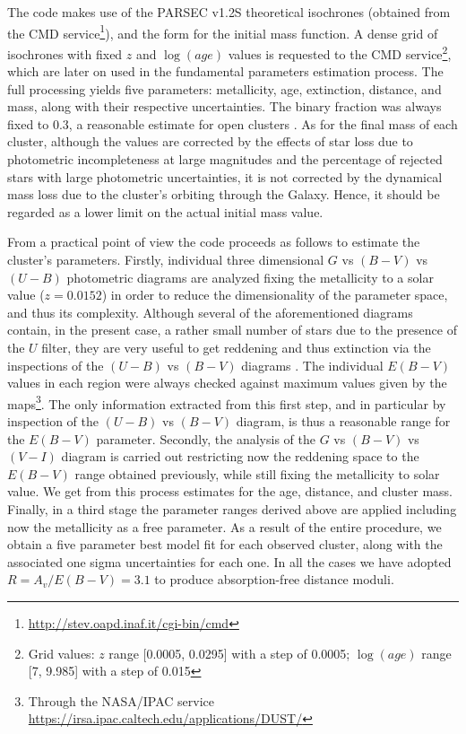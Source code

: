 \documentclass[draft]{aa}
\begin{document}
The code makes use of the PARSEC v1.2S \citep{Bressan_2012} theoretical
isochrones (obtained from the CMD
service\footnote{\url{http://stev.oapd.inaf.it/cgi-bin/cmd}}), and the
\cite{Kroupa_2002} form for the initial mass function. A dense grid of
isochrones with fixed $z$ and $\log(age)$ values is requested to the CMD
service\footnote{Grid values: $z$ range [0.0005, 0.0295] with a step of
0.0005; $\log(age)$ range [7, 9.985] with a step of 0.015}, which are later on
used in the fundamental parameters estimation
process. The full processing yields five parameters: metallicity, age,
extinction, distance, and mass, along with their respective uncertainties. The
binary fraction was always fixed to 0.3, a reasonable
estimate for open clusters \citep{Sollima_2010}. As for the final mass of each
cluster, although the values are corrected by the effects of star loss
due to photometric incompleteness at large magnitudes and the
percentage of rejected stars with large photometric uncertainties, it is not
corrected by the dynamical mass loss due to the cluster's orbiting through the
Galaxy. Hence, it should be regarded as a lower limit on the actual initial
mass value.

From a practical point of view the code proceeds as follows to estimate the
cluster's parameters. Firstly, individual three dimensional $G$ vs $(B-V)$ vs $
(U-B)$ photometric diagrams are analyzed fixing the metallicity to a solar
value ($z = 0.0152$) in order to reduce the dimensionality of the parameter
space, and thus its complexity. Although several of the aforementioned diagrams
contain, in the present case, a rather small number of stars due to the
presence of the $U$ filter, they are very useful to get reddening and thus
extinction via the inspections of the $(U-B)$ vs $(B-V)$ diagrams
\citep[e.g.,][]{Vazquez2008} .
%
The individual $E(B-V)$ values in each region were always checked against
maximum values given by the \cite{Schlafly_2011} maps\footnote{Through the
NASA/IPAC service \url{https://irsa.ipac.caltech.edu/applications/DUST/}}.
The only information extracted from this first step, and in particular
by inspection of the $(U-B)$ vs $(B-V)$ diagram, is thus a reasonable range for
the $E(B-V)$ parameter.
%
Secondly, the analysis of the $G$ vs $(B-V)$ vs $(V-I)$ diagram is carried out
restricting now the reddening space to the $E(B-V)$ range obtained previously,
while still fixing the metallicity to solar value. We get from this process
estimates for the age, distance, and cluster mass.
%
Finally, in a third stage the parameter ranges derived above are applied
including now the metallicity as a free parameter.
As a result of the entire procedure, we obtain a five parameter best model fit
for each observed cluster, along with the associated one sigma uncertainties
for each one. In all the cases we have adopted $R=A_v/E(B-V) = 3.1$ to produce 
absorption-free distance moduli.
\end{document}

